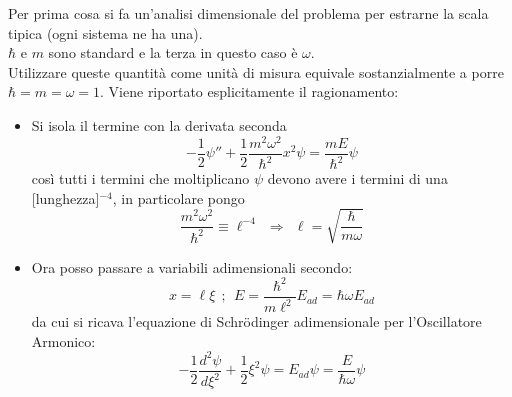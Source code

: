 \documentclass[twoside]{article}
\begin{document}
Per prima cosa si fa un'analisi dimensionale del problema per estrarne la scala tipica (ogni sistema ne ha una).
\\
$\hbar$ e $m$ sono standard e la terza in questo caso è $\omega$.
\\
Utilizzare queste quantità come unità di misura equivale sostanzialmente a porre $\hbar=m=\omega=1$. Viene riportato esplicitamente il ragionamento:
\begin{itemize}
    \item Si isola il termine con la derivata seconda
    \begin{equation*}
        -\frac{1}{2}\psi''+\frac{1}{2}\frac{m^2 \omega^2}{\hbar^2}x^2\psi=\frac{mE}{\hbar^2}\psi
    \end{equation*}
    così tutti i termini che moltiplicano $\psi$ devono avere i termini di una [lunghezza]$^{-4}$, in particolare pongo
    \begin{equation*}
    \frac{m^2 \omega^2}{\hbar^2}\equiv \ell^{-4} \ \ \Rightarrow \ \ \ell = \sqrt{\frac{\hbar}{m \omega}}
    \end{equation*}
    \item Ora posso passare a variabili adimensionali secondo:
    \begin{equation*}
        x=\ell \xi \ \ ; \ \ E=\frac{\hbar^2}{m \ell^2}E_{ad}=\hbar \omega E_{ad}
    \end{equation*}
    da cui si ricava l'equazione di Schr\"odinger adimensionale per l'Oscillatore Armonico:
    \begin{equation*}
        -\frac{1}{2}\frac{d^2 \psi}{d\xi^2}+ \frac{1}{2}\xi^2 \psi =E_{ad} \psi= \frac{E}{\hbar \omega}\psi
    \end{equation*}
\end{itemize}

\vspace{0.5cm}
\end{document}
